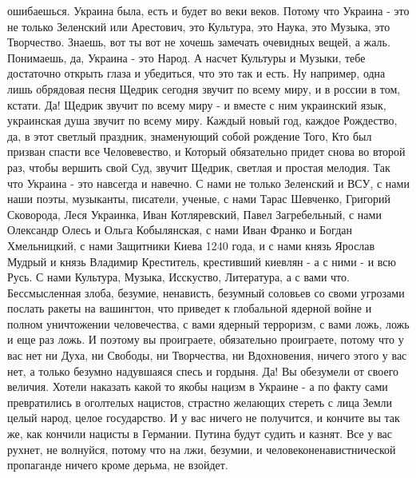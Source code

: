 
 
 
 
 

ошибаешься. Украина была, есть и будет во веки веков. Потому что Украина - это
не только Зеленский или Арестович, это Культура, это Наука, это Музыка, это
Творчество. Знаешь, вот ты вот не хочешь замечать очевидных вещей, а жаль.
Понимаешь, да, Украина - это Народ. А насчет Культуры и Музыки, тебе достаточно
открыть глаза и убедиться, что это так и есть. Ну например, одна лишь обрядовая
песня Щедрик сегодня звучит по всему миру, и в россии в том, кстати. Да!
Щедрик звучит по всему миру - и вместе с ним украинский язык, украинская душа
звучит по всему миру. Каждый новый год, каждое Рождество, да, в этот светлый
праздник, знаменующий собой рождение Того, Кто был призван спасти все
Человевество, и Который обязательно придет снова во второй раз, чтобы вершить
свой Суд, звучит Щедрик, светлая и простая мелодия.  Так что Украина - это
навсегда и навечно. С нами не только Зеленский и ВСУ, с нами наши поэты,
музыканты, писатели, ученые, с нами Тарас Шевченко, Григорий Сковорода, Леся
Украинка, Иван Котляревский, Павел Загребельный, с нами Олександр Олесь и Ольга
Кобылянская, с нами Иван Франко и Богдан Хмельницкий, с нами Защитники Киева
1240 года, и с нами князь Ярослав Мудрый и князь Владимир Креститель,
крестивший киевлян - а с ними - и всю Русь. С нами Культура, Музыка, Исскуство,
Литература, а с вами что.  Бессмысленная злоба, безумие, ненависть, безумный
соловьев со своми угрозами послать ракеты на вашингтон, что приведет к
глобальной ядерной войне и полном уничтожении человечества, с вами ядерный
терроризм, с вами ложь, ложь и еще раз ложь. И поэтому вы проиграете,
обязательно проиграете, потому что у вас нет ни Духа, ни Свободы, ни
Творчества, ни Вдохновения, ничего этого у вас нет, а только безумно надувшаяся
спесь и гордыня. Да! Вы обезумели от своего величия.  Хотели наказать какой то
якобы нацизм в Украине - а по факту сами превратились в оголтелых нацистов,
страстно желающих стереть с лица Земли целый народ, целое государство. И у вас
ничего не получится, и кончите вы так же, как кончили нацисты в Германии.
Путина будут судить и казнят. Все у вас рухнет, не волнуйся, потому что на лжи,
безумии, и человеконенавистнической пропаганде ничего кроме дерьма, не взойдет.

